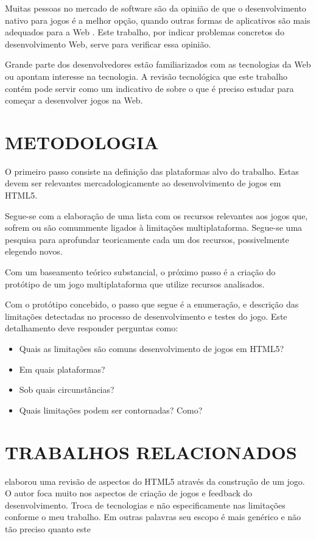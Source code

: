 Muitas pessoas no mercado de software são da opinião de que o
desenvolvimento nativo para jogos é a melhor opção, quando outras
formas de aplicativos são mais adequados para a Web \citet[p.
21]{aSeriousContender}. Este trabalho, por indicar problemas concretos
do desenvolvimento Web, serve para verificar essa opinião.

Grande parte dos desenvolvedores estão familiarizados com as
tecnologias da Web ou apontam interesse na tecnologia. A revisão
tecnológica que este trabalho contém pode servir como um indicativo
de sobre o que é preciso estudar para começar a desenvolver jogos na
Web.

\section{METODOLOGIA}
\thispagestyle{myheadings}

O primeiro passo consiste na definição das plataformas alvo do trabalho.
Estas devem ser relevantes mercadologicamente ao desenvolvimento de
jogos em HTML5.

Segue-se com a elaboração de uma lista com os recursos relevantes
aos jogos que, sofrem ou são comummente ligados à
limitações multiplataforma. Segue-se uma pesquisa para aprofundar
teoricamente cada um dos recursos, possivelmente elegendo novos.

Com um baseamento teórico substancial, o próximo passo é a criação
do protótipo de um jogo multiplataforma que utilize recursos
analisados.

Com o protótipo concebido, o passo que segue é a enumeração, e
descrição das limitações detectadas no processo de desenvolvimento e
testes do jogo. Este detalhamento deve responder perguntas como:

\begin{itemize}
\item Quais as limitações são comuns desenvolvimento de jogos em HTML5?
\item Em quais plataformas?
\item Sob quais circunstâncias?
\item Quais limitações podem ser contornadas? Como?
\end{itemize}


\section{TRABALHOS RELACIONADOS}
\citet{crossPlatformMobileGame} elaborou uma revisão de aspectos do
HTML5 através da construção de um jogo. O autor foca muito nos
aspectos de criação de jogos e feedback do desenvolvimento. Troca
de tecnologias e não especificamente nas limitações conforme o meu
trabalho. Em outras palavras seu escopo é mais genérico e não tão
preciso quanto este


